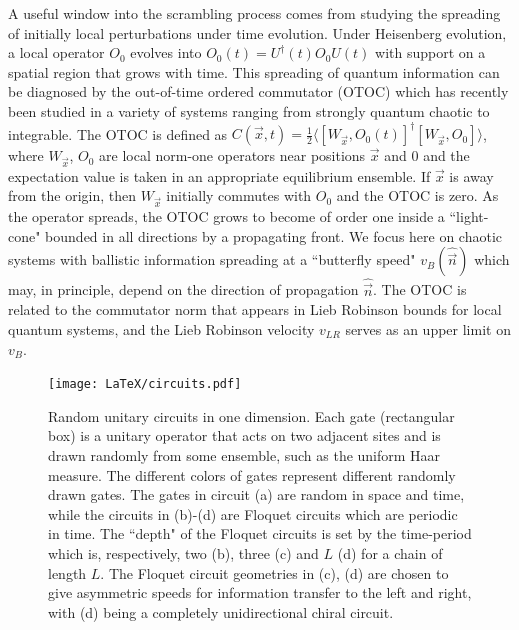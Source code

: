 \documentclass[aps,prx,reprint,superscriptaddress, longbibliography]{revtex4-1}
\begin{document}
A useful window into the scrambling process comes from studying the spreading of initially local perturbations under time evolution. Under Heisenberg evolution, a local operator $O_0$ evolves into $O_0(t) = U^\dagger(t) O_0 U(t)$ with support on a spatial region that grows with time. This spreading of quantum information can be diagnosed by the out-of-time ordered commutator (OTOC) which has recently been studied in a variety of systems ranging from strongly quantum chaotic to integrable. The OTOC is defined as $C(\vec{x},t) = \frac{1}{2} \langle [W_\vec{x}, O_0(t)]^\dagger [W_\vec{x}, O_0]\rangle$, where $W_\vec{x}$, $O_0$ are local norm-one operators near positions $\vec{x}$ and $0$ and the expectation value is taken in an appropriate equilibrium ensemble. If $\vec{x}$ is away from the origin, then $W_\vec{x}$ initially commutes with $O_0$ and the OTOC is zero. As the operator spreads, the OTOC grows to become of order one inside a ``light-cone" bounded in all directions by a propagating front. We focus here on chaotic systems with ballistic information spreading at a ``butterfly speed" $v_B(\hat{\vec{n}})$ which may, in principle, depend on the direction of propagation $\hat{\vec{n}}$. The OTOC is related to the commutator norm that appears in Lieb Robinson bounds for local quantum systems, and the Lieb Robinson velocity $v_{LR}$ serves as an upper limit on $v_B$. 

\begin{figure}
	\texttt{[image: LaTeX/circuits.pdf]}
	\caption{Random unitary circuits in one dimension. Each gate (rectangular box) is a unitary operator that acts on two adjacent sites and is drawn randomly from some ensemble, such as the uniform Haar measure. The different colors of gates represent different randomly drawn gates. The gates in circuit (a) are random in space and time, while the circuits in (b)-(d) are Floquet circuits which are periodic in time. The ``depth" of the Floquet circuits is set by the time-period which is, respectively, two (b), three (c) and $L$ (d) for a chain of length $L$. The Floquet circuit geometries in (c), (d) are chosen to give asymmetric speeds for information transfer to the left and right, with (d) being a completely unidirectional chiral circuit. 
	}
	\label{fig:circuits}
\end{figure}
\end{document}
